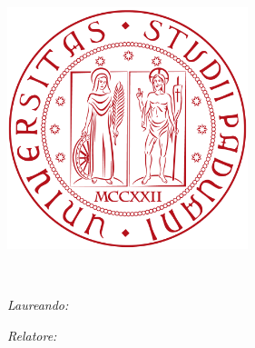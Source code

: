 \begin{titlepage}
	\begin{addmargin}[-1cm]{-3cm}
    \begin{center}
        \large  

        \hfill

        \vfill

        \begingroup
        	\textcolor{redUni}{\textls[160]{\scshape{\huge \myUni}}}\\ \bigskip
        	
        	\textls[80]{\scshape{\LARGE \myDepartment}}\\ \medskip
        	
			\textls[80]{\scshape{\Large \myDegree}}\\
            
        \endgroup

        \vfill

        \includegraphics[width=7cm]{gfx/unipd_sigillo} \\ \medskip
		
		\vfill		
		
		\textcolor{redUni}{\textls[80]{\scshape{\LARGE \myTitle}}} \\ \medskip
        
        \vfill
        
        
		\begin{minipage}{0.5\textwidth}
			\begin{flushleft}
			\emph{Laureando:}\\
			\textsc{\large \myName}
			\end{flushleft}
		\end{minipage}
		\begin{minipage}{0.5\textwidth}
			\begin{flushright}
			\emph{Relatore:}\\
			\textsc{\large \myProf}
			\end{flushright}
		\end{minipage}        
        

\end{center}
\end{addmargin}
\end{titlepage}
